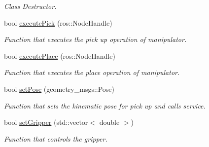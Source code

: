 \begin{DoxyCompactItemize}
\begin{DoxyCompactList}\small\item\em Class Destructor. \end{DoxyCompactList}\item 
bool \hyperlink{classPickPlace_a51c838f80b9c4e081d67799bbfba334c}{execute\+Pick} (ros\+::\+Node\+Handle)
\begin{DoxyCompactList}\small\item\em Function that executes the pick up operation of manipulator. \end{DoxyCompactList}\item 
bool \hyperlink{classPickPlace_a796ffb05d862d37d753dca1ea1db6165}{execute\+Place} (ros\+::\+Node\+Handle)
\begin{DoxyCompactList}\small\item\em Function that executes the place operation of manipulator. \end{DoxyCompactList}\item 
bool \hyperlink{classPickPlace_a8a205b4bf0394626ebc68bd4c37a5182}{set\+Pose} (geometry\+\_\+msgs\+::\+Pose)
\begin{DoxyCompactList}\small\item\em Function that sets the kinematic pose for pick up and calls service. \end{DoxyCompactList}\item 
bool \hyperlink{classPickPlace_afbfbcb7763486a40937abf9be2505c61}{set\+Gripper} (std\+::vector$<$ double $>$)
\begin{DoxyCompactList}\small\item\em Function that controls the gripper. \end{DoxyCompactList}\end{DoxyCompactItemize}
